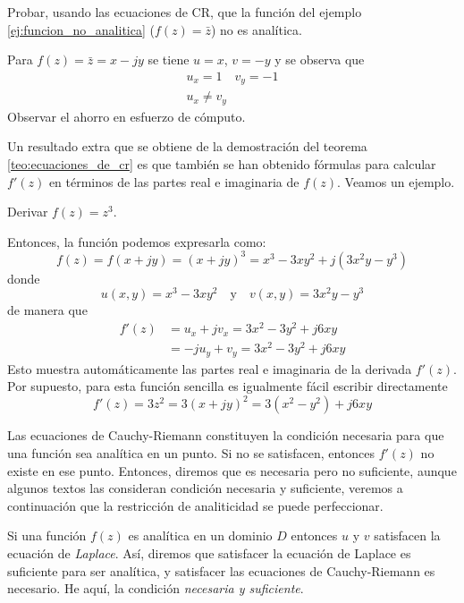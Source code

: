 \begin{example}
  Probar, usando las ecuaciones de CR, que la función del ejemplo \ref{ej:funcion_no_analitica} ($f(z)=\bar{z}$) no es analítica.

  Para $f(z)=\bar{z}=x-jy$ se tiene $u=x$, $v=-y$ y se observa que
  \begin{gather*}
    u_x=1 \quad v_y = -1 \\ 
    u_x \neq v_y
  \end{gather*}
  Observar el ahorro en esfuerzo de cómputo.
\end{example}

Un resultado extra que se obtiene de la demostración del teorema \ref{teo:ecuaciones_de_cr} es que también se han obtenido fórmulas para calcular $f'(z)$ en términos de las partes real e imaginaria de $f(z)$. Veamos un ejemplo.
\begin{example}
  Derivar $f(z)=z^3$. 

  Entonces, la función podemos expresarla como: 
  \begin{equation*}
    f(z)=f(x+jy)=(x+jy)^3 = x^3-3xy^2 + j(3x^2y-y^3)
  \end{equation*}
  donde 
  \begin{equation*}
    u(x,y)=x^3-3xy^2 \quad \text{y} \quad v(x,y)=3x^2y-y^3
  \end{equation*}
  de manera que
  \begin{align*}
    f'(z)&=u_x+jv_x = 3x^2 - 3y^2 + j6xy \\ 
         &=-ju_y+v_y = 3x^2-3y^2 + j6xy
  \end{align*}
  Esto muestra automáticamente las partes real e imaginaria de la derivada $f'(z)$. Por supuesto, para esta función sencilla es igualmente fácil escribir directamente
  \begin{equation*}
    f'(z)=3z^2=3(x+jy)^2=3(x^2-y^2)+j6xy
  \end{equation*}
\end{example}

Las ecuaciones de Cauchy-Riemann constituyen la condición necesaria para que una función sea analítica en un punto. Si no se satisfacen, entonces $f'(z)$ no existe en ese punto. Entonces, diremos que es necesaria pero no suficiente, aunque algunos textos las consideran condición necesaria y suficiente, veremos a continuación que la restricción de analiticidad se puede perfeccionar.

Si una función $f(z)$ es analítica en un dominio $D$ entonces $u$ y $v$ satisfacen la ecuación de \textit{Laplace}. Así, diremos que satisfacer la ecuación de Laplace es suficiente para ser analítica, y satisfacer las ecuaciones de Cauchy-Riemann es necesario. He aquí, la condición \textit{necesaria y suficiente}. 

